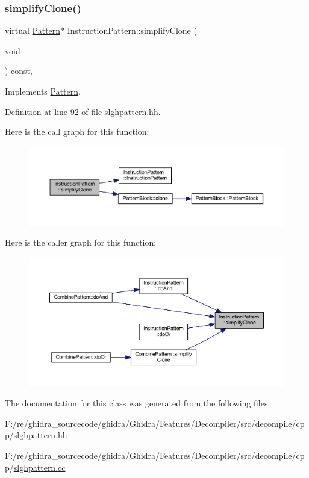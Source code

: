 \subsubsection{\texorpdfstring{simplifyClone()}{simplifyClone()}}
{\footnotesize\ttfamily virtual \mbox{\hyperlink{class_pattern}{Pattern}}$\ast$ Instruction\+Pattern\+::simplify\+Clone (\begin{DoxyParamCaption}\item[{void}]{ }\end{DoxyParamCaption}) const\hspace{0.3cm}{\ttfamily [inline]}, {\ttfamily [virtual]}}



Implements \mbox{\hyperlink{class_pattern_a9c2c1383d7f836f8af237a03e463d94d}{Pattern}}.



Definition at line 92 of file slghpattern.\+hh.

Here is the call graph for this function\+:
\nopagebreak
\begin{figure}[H]
\begin{center}
\leavevmode
\includegraphics[width=350pt]{class_instruction_pattern_ad257e6ff03279c9366d7568b011c72a5_cgraph}
\end{center}
\end{figure}
Here is the caller graph for this function\+:
\nopagebreak
\begin{figure}[H]
\begin{center}
\leavevmode
\includegraphics[width=350pt]{class_instruction_pattern_ad257e6ff03279c9366d7568b011c72a5_icgraph}
\end{center}
\end{figure}


The documentation for this class was generated from the following files\+:\begin{DoxyCompactItemize}
\item 
F\+:/re/ghidra\+\_\+sourcecode/ghidra/\+Ghidra/\+Features/\+Decompiler/src/decompile/cpp/\mbox{\hyperlink{slghpattern_8hh}{slghpattern.\+hh}}\item 
F\+:/re/ghidra\+\_\+sourcecode/ghidra/\+Ghidra/\+Features/\+Decompiler/src/decompile/cpp/\mbox{\hyperlink{slghpattern_8cc}{slghpattern.\+cc}}\end{DoxyCompactItemize}
